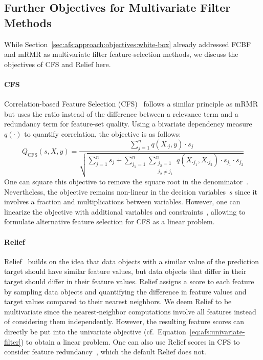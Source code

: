 \documentclass{article}
\theoremstyle{definition}
\begin{document}
\subsection{Further Objectives for Multivariate Filter Methods}
\label{sec:afs:appendix:multivariate-filter-objectives}

While Section~\ref{sec:afs:approach:objectives:white-box} already addressed FCBF and mRMR as multivariate filter feature-selection methods, we discuss the objectives of CFS and Relief here.

\paragraph{CFS}

Correlation-based Feature Selection (CFS)~\cite{hall1999correlation, hall2000correlation} follows a similar principle as mRMR but uses the ratio instead of the difference between a relevance term and a redundancy term for feature-set quality.
Using a bivariate dependency measure $q(\cdot)$ to quantify correlation, the objective is as follows:
%
\begin{equation}
	Q_{\text{CFS}}(s,X,y) = \frac{\sum_{j=1}^{n} q(X_{\cdot{}j},y) \cdot s_j}{\sqrt{\sum_{j=1}^{n} s_j + \sum_{j_1=1}^{n} \sum_{\substack{j_2=1 \\ j_2 \neq j_1}}^{n} q(X_{\cdot{}j_1}, X_{\cdot{}j_2}) \cdot s_{j_1} \cdot s_{j_2}}}
	\label{eq:afs:cfs}
\end{equation}
%
One can square this objective to remove the square root in the denominator~\cite{nguyen2010towards}.
Nevertheless, the objective remains non-linear in the decision variables~$s$ since it involves a fraction and multiplications between variables.
However, one can linearize the objective with additional variables and constraints~\cite{nguyen2010improving, nguyen2010towards}, allowing to formulate alternative feature selection for CFS as a linear problem.

\paragraph{Relief}

Relief~\cite{kira1992feature, robnik1997adaptation} builds on the idea that data objects with a similar value of the prediction target should have similar feature values, but data objects that differ in their target should differ in their feature values.
Relief assigns a score to each feature by sampling data objects and quantifying the difference in feature values and target values compared to their nearest neighbors.
We deem Relief to be multivariate since the nearest-neighbor computations involve all features instead of considering them independently.
However, the resulting feature scores can directly be put into the univariate objective (cf.~Equation~\ref{eq:afs:univariate-filter}) to obtain a linear problem.
One can also use Relief scores in CFS to consider feature redundancy~\cite{hall1999correlation, hall2000correlation}, which the default Relief does not.
\end{document}
